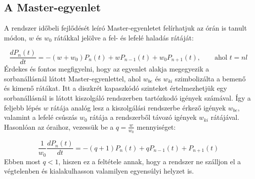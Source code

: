 \section{} \label{sec:3}

\subsection{A Master-egyenlet}
A rendszer időbeli fejlődését leíró Master-egyenletet felírhatjuk az órán is tanult módon, $w$ és $w_{0}$ rátákkal jelölve a fel- és lefelé haladás rátáját:

\begin{equation} \label{eq:58}
    \frac{d P_{n} \left( t \right)}{d t}
    =
    - \left( w + w_{0} \right) P_{n} \left( t \right)
    +
    w P_{n-1} \left( t \right)
    +
    w_{0} P_{n+1} \left( t \right),
    \quad \quad
    \text{ahol } t = nl
\end{equation}
Érdekes és fontos megfigyelni, hogy az egyenlet alakja megegyezik a sorbanállásnál látott Master-egyenlettel, ahol $w_{be}$ és $w_{ki}$ szimbolizálta a bemenő és kimenő rátákat. Itt a diszkrét kapaszkódó szinteket értelmezhetjük egy sorbanállásnál is látott kiszolgáló rendszerben tartózkodó igények számával. Így a feljebb lépés $w$ rátája analóg lesz a kiszolgálási rendszerbe érkező igények $w_{be}$, valamint a lefelé csúszás $w_{0}$ rátája a rendszerből távozó igények $w_{ki}$ rátájával. Hasonlóan az óraihoz, vezessük be a $q = \frac{w}{w_{0}}$ mennyiséget:

\begin{equation} \label{eq:59}
    \frac{1}{w_{0}} \frac{d P_{n} \left( t \right)}{d t}
    =
    - \left( q + 1 \right) P_{n} \left( t \right) + q P_{n-1} \left( t \right) + P_{n+1} \left( t \right)
\end{equation}
Ebben most $q < 1$, hiszen ez a feltétele annak, hogy a rendszer ne szálljon el a végtelenben és kialakulhasson valamilyen egyensúlyi helyzet is.

